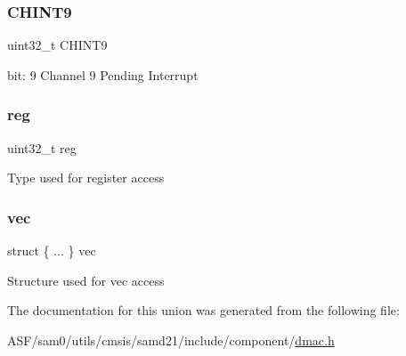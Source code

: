 \subsubsection{\texorpdfstring{CHINT9}{CHINT9}}
{\footnotesize\ttfamily uint32\+\_\+t C\+H\+I\+N\+T9}

bit\+: 9 Channel 9 Pending Interrupt \mbox{\label{union_d_m_a_c___i_n_t_s_t_a_t_u_s___type_a6b91636401516a477989a336376d7b40}} 
\subsubsection{\texorpdfstring{reg}{reg}}
{\footnotesize\ttfamily uint32\+\_\+t reg}

Type used for register access \mbox{\label{union_d_m_a_c___i_n_t_s_t_a_t_u_s___type_a6db11e42f6f46d5b8f61cd9eb3520430}} 
\subsubsection{\texorpdfstring{vec}{vec}}
{\footnotesize\ttfamily struct \{ ... \}   vec}

Structure used for vec access 

The documentation for this union was generated from the following file\+:\begin{DoxyCompactItemize}
\item 
A\+S\+F/sam0/utils/cmsis/samd21/include/component/\mbox{\hyperlink{component_2dmac_8h}{dmac.\+h}}\end{DoxyCompactItemize}
